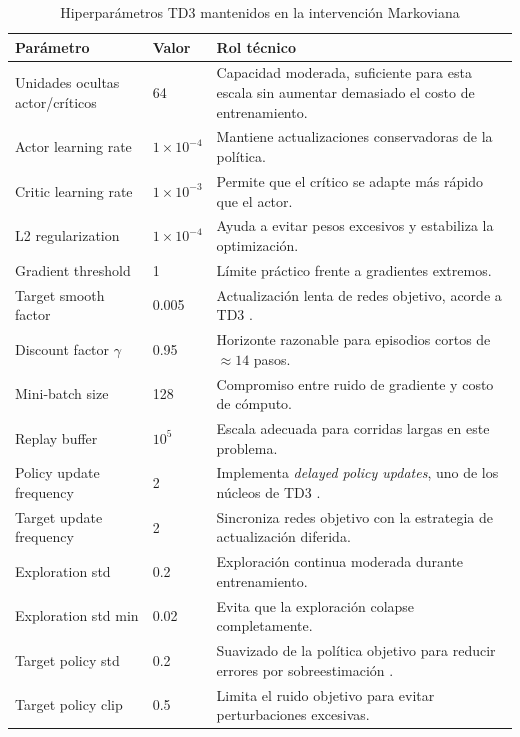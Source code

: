 \documentclass[11pt,a4paper]{article}
\begin{document}
\begin{table}[H]
\centering
\caption{Hiperpar\'ametros TD3 mantenidos en la intervenci\'on Markoviana}
\label{tab:td3hparams}
\small
\setlength{\tabcolsep}{5pt}
\renewcommand{\arraystretch}{1.15}
\begin{tabularx}{\textwidth}{L{0.30\textwidth}C{0.15\textwidth}Y}
\toprule
\textbf{Par\'ametro} & \textbf{Valor} & \textbf{Rol t\'ecnico} \\
\midrule
Unidades ocultas actor/cr\'iticos & 64 & Capacidad moderada, suficiente para esta escala sin aumentar demasiado el costo de entrenamiento. \\
Actor learning rate & \(1\times10^{-4}\) & Mantiene actualizaciones conservadoras de la pol\'itica. \\
Critic learning rate & \(1\times10^{-3}\) & Permite que el cr\'itico se adapte m\'as r\'apido que el actor. \\
L2 regularization & \(1\times10^{-4}\) & Ayuda a evitar pesos excesivos y estabiliza la optimizaci\'on. \\
Gradient threshold & 1 & L\'imite pr\'actico frente a gradientes extremos. \\
Target smooth factor & 0.005 & Actualizaci\'on lenta de redes objetivo, acorde a TD3 \citep{mathworks_td3_options}. \\
Discount factor \(\gamma\) & 0.95 & Horizonte razonable para episodios cortos de \(\approx 14\) pasos. \\
Mini-batch size & 128 & Compromiso entre ruido de gradiente y costo de c\'omputo. \\
Replay buffer & \(10^5\) & Escala adecuada para corridas largas en este problema. \\
Policy update frequency & 2 & Implementa \textit{delayed policy updates}, uno de los n\'ucleos de TD3 \citep{fujimoto2018td3}. \\
Target update frequency & 2 & Sincroniza redes objetivo con la estrategia de actualizaci\'on diferida. \\
Exploration std & 0.2 & Exploraci\'on continua moderada durante entrenamiento. \\
Exploration std min & 0.02 & Evita que la exploraci\'on colapse completamente. \\
Target policy std & 0.2 & Suavizado de la pol\'itica objetivo para reducir errores por sobreestimaci\'on \citep{fujimoto2018td3}. \\
Target policy clip & 0.5 & Limita el ruido objetivo para evitar perturbaciones excesivas. \\
\bottomrule
\end{tabularx}
\normalsize
\end{table}
\end{document}
